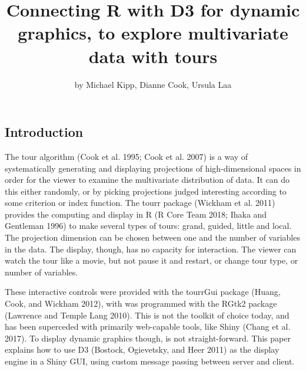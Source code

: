 \title{Connecting R with D3 for dynamic graphics, to explore multivariate data
with tours}
\author{by Michael Kipp, Dianne Cook, Ursula Laa}

\maketitle


\subsection{Introduction}\label{introduction}

The tour algorithm (Cook et al. 1995; Cook et al. 2007) is a way of
systematically generating and displaying projections of high-dimensional
spaces in order for the viewer to examine the multivariate distribution
of data. It can do this either randomly, or by picking projections
judged interesting according to some criterion or index function. The
tourr package (Wickham et al. 2011) provides the computing and display
in R (R Core Team 2018; Ihaka and Gentleman 1996) to make several types
of tours: grand, guided, little and local. The projection dimension can
be chosen between one and the number of variables in the data. The
display, though, has no capacity for interaction. The viewer can watch
the tour like a movie, but not pause it and restart, or change tour
type, or number of variables.

These interactive controls were provided with the tourrGui package
(Huang, Cook, and Wickham 2012), with was programmed with the RGtk2
package (Lawrence and {Temple Lang} 2010). This is not the toolkit of
choice today, and has been superceded with primarily web-capable tools,
like Shiny (Chang et al. 2017). To display dynamic graphics though, is
not straight-forward. This paper explains how to use D3 (Bostock,
Ogievetsky, and Heer 2011) as the display engine in a Shiny GUI, using
custom message passing between server and client.

